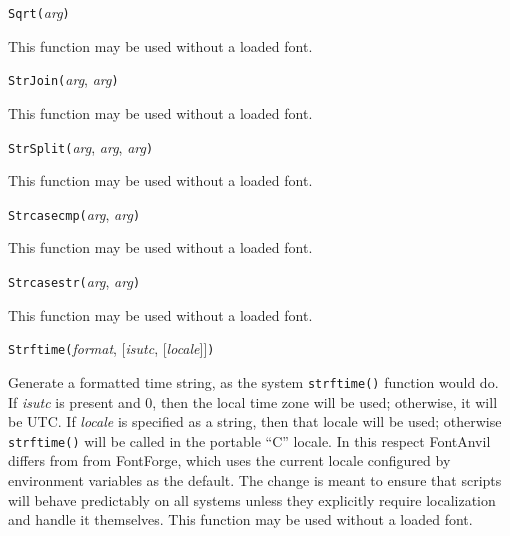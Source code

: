 

\texttt{Sqrt(}\textit{arg}\texttt{)}

This function may be used without a loaded font.



\texttt{StrJoin(}\textit{arg}, \textit{arg}\texttt{)}

This function may be used without a loaded font.



\texttt{StrSplit(}\textit{arg}, \textit{arg}, \textit{arg}\texttt{)}

This function may be used without a loaded font.



\texttt{Strcasecmp(}\textit{arg}, \textit{arg}\texttt{)}

This function may be used without a loaded font.



\texttt{Strcasestr(}\textit{arg}, \textit{arg}\texttt{)}

This function may be used without a loaded font.



\texttt{Strftime(}\textit{format}, [\textit{isutc}, [\textit{locale}]]\texttt{)}

Generate a formatted time string, as the system \texttt{strftime()} function
would do.  If \textit{isutc} is present and 0, then the local time zone will
be used; otherwise, it will be UTC.  If \textit{locale} is specified as a
string, then that locale will be used; otherwise \texttt{strftime()} will be
called in the portable ``C'' locale.  In this respect FontAnvil differs from
from \FFdiff FontForge, which uses the current locale configured by
environment variables as the default.  The change is meant to ensure that
scripts will behave predictably on all systems unless they explicitly
require localization and handle it themselves.  This function may be used
without a loaded font.

